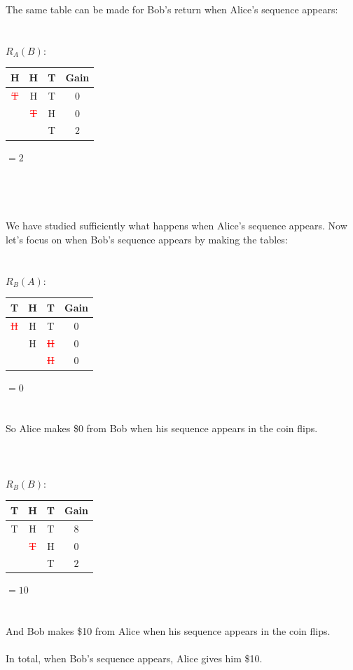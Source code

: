 \documentclass[english,12pt,a4paper,final]{article}
\begin{document}
The same table can be made for Bob's return when Alice's sequence appears:
\\\\\\
$R_A(B)$:
\begin{tabular}{|ccc|c|}
	\hline
	H & H & T & Gain \\
	\hline
	
	\textcolor{red}{\sout{T}} & H & T & $0$ \\
	
	& \textcolor{red}{\sout{T}} & H & $0$ \\
	
	&  & \textcolor{OliveGreen}{T} & $2$ \\
	\hline
\end{tabular}
$=2$
\\\\\\\\\\
We have studied sufficiently what happens when Alice's sequence appears. Now let's focus on when Bob's sequence appears by making the tables:
\\\\\\
$R_B(A)$:
\begin{tabular}{|ccc|c|}
	\hline
	T & H & T & Gain \\
	\hline
	
	\textcolor{red}{\sout{H}} & H & T & $0$ \\
	
	& \textcolor{OliveGreen}{H} & \textcolor{red}{\sout{H}} & $0$ \\
	
	&  & \textcolor{red}{\sout{H}} & $0$ \\
	\hline
\end{tabular}
$=0$
\\\\\\
So Alice makes \$0 from Bob when his sequence appears in the coin flips.
\\\\\\\\

$R_B(B)$:
\begin{tabular}{|ccc|c|}
	\hline
	T & H & T & Gain \\
	\hline
	
	\textcolor{OliveGreen}{T} & \textcolor{OliveGreen}{H} & \textcolor{OliveGreen}{T} & $8$ \\
	
	& \textcolor{red}{\sout{T}} & H & $0$ \\
	
	&  & \textcolor{OliveGreen}{T} & $2$ \\
	\hline
\end{tabular}
$=10$
\\\\\\
And Bob makes \$10 from Alice when his sequence appears in the coin flips.
\\\\
In total, when Bob's sequence appears, Alice gives him \$10.
\end{document}
